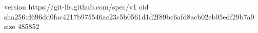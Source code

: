 version https://git-lfs.github.com/spec/v1
oid sha256:d696dd0fac4217b975546ac23c5b0561d1d2f89bc6afd8acb02eb05edf29b7a9
size 485852
